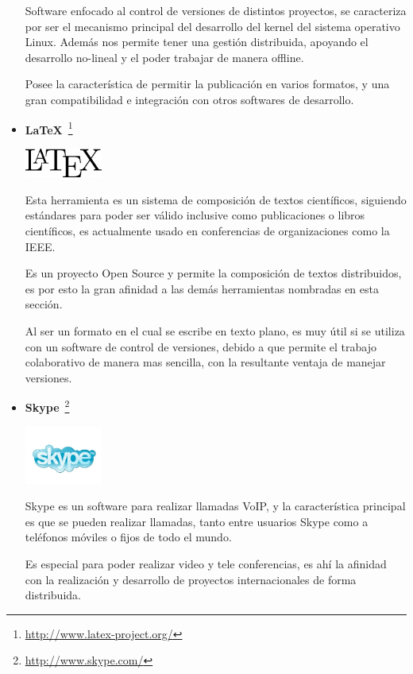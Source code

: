 \begin{itemize}
	Software enfocado al control de versiones de distintos proyectos,
	se caracteriza por ser el mecanismo principal del desarrollo del kernel
	del sistema operativo Linux. Además nos permite tener una gestión 
	distribuida, apoyando el desarrollo no-lineal y el poder trabajar
	de manera offline.

	Posee la característica de permitir la publicación en varios formatos,
	y una gran compatibilidad e integración con otros softwares de desarrollo.

	\item \textbf{LaTeX}~\footnote{\url{http://www.latex-project.org/}}

	\begin{center}
	    \includegraphics[width=0.2\textwidth]{../3-workshop/1-metodologia/img/latex}
	\end{center}

	Esta herramienta es un sistema de composición de textos científicos,
	siguiendo estándares para poder ser válido inclusive como publicaciones
	o libros científicos, es actualmente usado en conferencias de organizaciones
	como la IEEE.

	Es un proyecto Open Source y permite la composición de textos distribuidos,
	es por esto la gran afinidad a las demás herramientas nombradas en esta sección.

	Al ser un formato en el cual se escribe en texto plano, es muy útil si se utiliza
	con un software de control de versiones, debido a que permite el trabajo
    colaborativo de manera mas sencilla, con la resultante ventaja de manejar versiones.

	\item \textbf{Skype}~\footnote{\url{http://www.skype.com/}}

	\begin{center}
	    \includegraphics[width=0.2\textwidth]{../3-workshop/1-metodologia/img/skype}
	\end{center}


	Skype es un software para realizar llamadas VoIP, y la característica principal
	es que se pueden realizar llamadas, tanto entre usuarios Skype como a teléfonos
	móviles o fijos de todo el mundo.

	Es especial para poder realizar video y tele conferencias,
	es ahí la afinidad con la realización y desarrollo de proyectos internacionales
	de forma distribuida.

\end{itemize}


